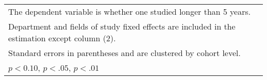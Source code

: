 \begin{table}[htbp]
\begin{adjustbox}{max width=0.5\textwidth}
\begin{tabular}{l*{4}{c}}
\hline\hline
\multicolumn{5}{l}{\footnotesize The dependent variable is whether one studied longer than 5 years.}\\
\multicolumn{5}{l}{\footnotesize Department and fields of study fixed effects are included in the estimation except column (2).}\\
\multicolumn{5}{l}{\footnotesize Standard errors in parentheses and are clustered by cohort level.}\\
\multicolumn{5}{l}{\footnotesize \sym{*} \(p<0.10\), \sym{**} \(p<.05\), \sym{***} \(p<.01\)}\\
\end{tabular}%
	\end{adjustbox}
\end{table}